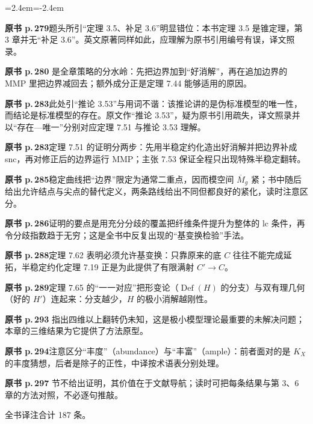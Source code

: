 \begin{list}{}{\leftmargin=2.4em\itemindent=-2.4em\itemsep=2pt\parsep=0pt}
\item \textbf{原书 p.\,279}\quad 题头所引“定理 3.5、补足 3.6”明显错位：本书定理 3.5 是锥定理，第 3 章并无“补足 3.6”。英文原著同样如此，应理解为原书引用编号有误，译文照录。
\item \textbf{原书 p.\,280} 是全章策略的分水岭：先把边界加到“好消解”，再在追加边界的 MMP 里把边界减回去；额外成分正是定理 7.44 能够适用的原因。
\item \textbf{原书 p.\,283}\quad 此处引“推论 3.53”与用词不谐：该推论讲的是伪标准模型的唯一性，而结论是标准模型的存在。原文作“推论 3.53”，疑为原书引用疏失，译文照录并以“存在—唯一”分别对应定理 7.51 与推论 3.53 理解。
\item \textbf{原书 p.\,283}\quad 定理 7.51 的证明分两步：先用半稳定约化造出好消解并把边界补成 snc，再对修正后的边界运行 MMP；主张 7.53 保证全程只出现特殊半稳定翻转。
\item \textbf{原书 p.\,285}\quad 稳定曲线把“边界”限定为通常二重点，因而模空间 $\overline{M}_g$ 紧；书中随后给出允许结点与尖点的替代定义，两条路线给出不同但都良好的紧化，读时注意区分。
\item \textbf{原书 p.\,286}\quad 证明的要点是用充分分歧的覆盖把纤维条件提升为整体的 lc 条件，再令分歧指数趋于无穷；这是全书中反复出现的“基变换检验”手法。
\item \textbf{原书 p.\,288}\quad 定理 7.62 表明必须允许基变换：只靠原来的底 $C$ 往往不能完成延拓，半稳定约化定理 7.19 正是为此提供了有限满射 $C'\to C$。
\item \textbf{原书 p.\,289}\quad 定理 7.65 的“一一对应”把形变论（$\operatorname{Def}(H)$ 的分支）与双有理几何（好的 $H'$）连起来：分支越少，$H$ 的极小消解越刚性。
\item \textbf{原书 p.\,293} 指出四维以上翻转仍未知，这是极小模型理论最重要的未解决问题；本章的三维结果为它提供了方法原型。
\item \textbf{原书 p.\,294}\quad 注意区分“丰度”（abundance）与“丰富”（ample）：前者面对的是 $K_X$ 的丰度猜想，后者是除子的正性，中译按术语表分别处理。
\item \textbf{原书 p.\,297} 节不给出证明，其价值在于文献导航；读时可把每条结果与第 3、6 章的方法对照，不必逐句推敲。
\end{list}

\vspace{1em}\noindent 全书译注合计 187 条。
